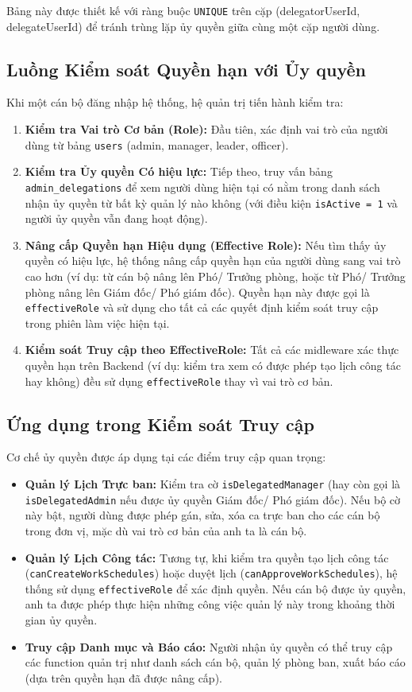 \documentclass[18pt,a4paper]{report}
\begin{document}
Bảng này được thiết kế với ràng buộc \texttt{UNIQUE} trên cặp (delegatorUserId, delegateUserId) để tránh trùng lặp ủy quyền giữa cùng một cặp người dùng.

\subsection{Luồng Kiểm soát Quyền hạn với Ủy quyền}
Khi một cán bộ đăng nhập hệ thống, hệ quản trị tiến hành kiểm tra:
\begin{enumerate}[leftmargin=1.2cm]
    \item \textbf{Kiểm tra Vai trò Cơ bản (Role):} Đầu tiên, xác định vai trò của người dùng từ bảng \texttt{users} (admin, manager, leader, officer).
    \item \textbf{Kiểm tra Ủy quyền Có hiệu lực:} Tiếp theo, truy vấn bảng \texttt{admin\_delegations} để xem người dùng hiện tại có nằm trong danh sách nhận ủy quyền từ bất kỳ quản lý nào không (với điều kiện \texttt{isActive = 1} và người ủy quyền vẫn đang hoạt động).
    \item \textbf{Nâng cấp Quyền hạn Hiệu dụng (Effective Role):} Nếu tìm thấy ủy quyền có hiệu lực, hệ thống nâng cấp quyền hạn của người dùng sang vai trò cao hơn (ví dụ: từ cán bộ nâng lên Phó/ Trưởng phòng, hoặc từ Phó/ Trưởng phòng nâng lên Giám đốc/ Phó giám đốc). Quyền hạn này được gọi là \texttt{effectiveRole} và sử dụng cho tất cả các quyết định kiểm soát truy cập trong phiên làm việc hiện tại.
    \item \textbf{Kiểm soát Truy cập theo EffectiveRole:} Tất cả các midleware xác thực quyền hạn trên Backend (ví dụ: kiểm tra xem có được phép tạo lịch công tác hay không) đều sử dụng \texttt{effectiveRole} thay vì vai trò cơ bản.
\end{enumerate}

\subsection{Ứng dụng trong Kiểm soát Truy cập}
Cơ chế ủy quyền được áp dụng tại các điểm truy cập quan trọng:

\begin{itemize}[leftmargin=1.2cm]
    \item \textbf{Quản lý Lịch Trực ban:} Kiểm tra cờ \texttt{isDelegatedManager} (hay còn gọi là \texttt{isDelegatedAdmin} nếu được ủy quyền Giám đốc/ Phó giám đốc). Nếu bộ cờ này bật, người dùng được phép gán, sửa, xóa ca trực ban cho các cán bộ trong đơn vị, mặc dù vai trò cơ bản của anh ta là cán bộ.
    \item \textbf{Quản lý Lịch Công tác:} Tương tự, khi kiểm tra quyền tạo lịch công tác (\texttt{canCreateWorkSchedules}) hoặc duyệt lịch (\texttt{canApproveWorkSchedules}), hệ thống sử dụng \texttt{effectiveRole} để xác định quyền. Nếu cán bộ được ủy quyền, anh ta được phép thực hiện những công việc quản lý này trong khoảng thời gian ủy quyền.
    \item \textbf{Truy cập Danh mục và Báo cáo:} Người nhận ủy quyền có thể truy cập các function quản trị như danh sách cán bộ, quản lý phòng ban, xuất báo cáo (dựa trên quyền hạn đã được nâng cấp).
\end{itemize}
\end{document}
